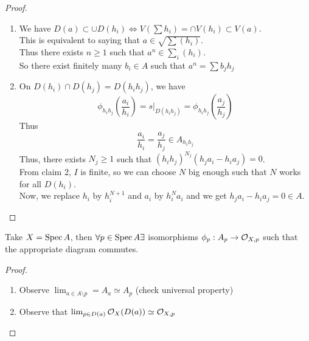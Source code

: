 \documentclass[../main.tex]{subfiles}
\begin{document}
\begin{proof}
\begin{enumerate}
\item We have $D( a) \subset \cup D( h_i) \iff V( \sum h_i)  = \cap V( h_i) \subset V( a) $.\\
	This is equivalent to saying that $a\in \sqrt{\sum ( h_i) } $.\\
	Thus there exists $n \geq 1$ such that $a^{n}\in \sum_{i}^{ }( h_i) $.\\
	So there exist finitely many $b_i \in A$ such that $a^{n}= \sum b_j h_j $ 
\item On $D( h_i) \cap D( h_j) = D( h_i h_j) $, we have
	\[ 
	\phi_{h_ih_j} ( \frac{a_i}{h_i}) = s|_{D( h_i h_j) } = \phi_{h_ih_j} ( \frac{a_j}{h_j}) 
	\]
	Thus 
	\[ 
	\frac{a_i}{h_i}= \frac{a_j}{h_j}\in A_{h_i h_j}
	\]
	Thus, there exists $N_{j}  \geq 1$ such that $( h_i h_j)^{N_j }( h_j a_i - h_i a_j) =0$.\\
	From claim 2, $I$ is finite, so we can choose $N$ big enough such that $N$ works for all $D( h_i) $.\\
	Now, we replace $h_i $ by $h_i^{N+1}$ and $a_i$ by $h_i^{N}a_i$ and we get $h_j a_i -h_i a_j =0 \in A$.
\end{enumerate}
\end{proof}
\begin{crly}
Take $X= \operatorname{Spec} A$, then $\forall p \in \operatorname{Spec} A\exists $ isomorphisms $\phi_p: A_p \to \mathcal{O}_{X,p} $ such that the appropriate diagram commutes.
\end{crly}
\begin{proof}
\begin{enumerate}
\item Observe $\lim_{a\in A\setminus p} = A_a \simeq A_p$ (check universal property) 
\item Observe that $\lim_{p \in D( a) } \mathcal{O}_X( D( a) ) \simeq \mathcal{O}_{X,p} $ 
\end{enumerate}
\end{proof}
\end{document}

